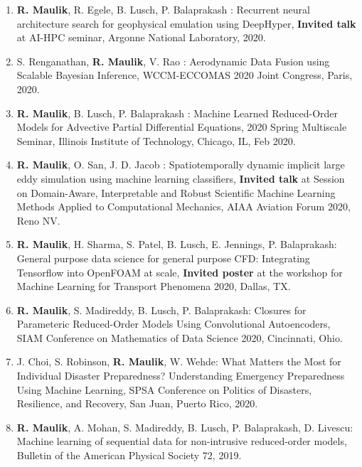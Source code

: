 \documentclass[letterpaper]{article}
\begin{document}
\begin{enumerate}

\item \textbf{R. Maulik}, R. Egele, B. Lusch, P. Balaprakash : Recurrent neural architecture search for geophysical emulation using DeepHyper, \textbf{Invited talk} at AI-HPC seminar, Argonne National Laboratory, 2020.

\item S. Renganathan, \textbf{R. Maulik}, V. Rao : Aerodynamic Data Fusion using Scalable Bayesian Inference, WCCM-ECCOMAS 2020 Joint Congress, Paris, 2020.

\item \textbf{R. Maulik}, B. Lusch, P. Balaprakash : Machine Learned Reduced-Order Models for Advective Partial Differential Equations, 2020 Spring Multiscale Seminar, Illinois Institute of Technology, Chicago, IL, Feb 2020.

\item \textbf{R. Maulik}, O. San, J. D. Jacob : Spatiotemporally dynamic implicit large eddy simulation using machine learning classifiers, \textbf{Invited talk} at Session on Domain-Aware, Interpretable and Robust Scientific Machine Learning Methods Applied to Computational Mechanics, AIAA Aviation Forum 2020, Reno NV. 

\item \textbf{R. Maulik}, H. Sharma, S. Patel, B. Lusch, E. Jennings, P. Balaprakash: General purpose data science for general purpose CFD: Integrating Tensorflow into OpenFOAM at scale, \textbf{Invited poster} at the workshop for Machine Learning for Transport Phenomena 2020, Dallas, TX.

\item \textbf{R. Maulik}, S. Madireddy, B. Lusch, P. Balaprakash: Closures for Parameteric Reduced-Order Models Using Convolutional Autoencoders, SIAM Conference on Mathematics of Data Science 2020, Cincinnati, Ohio.

\item J. Choi, S. Robinson, \textbf{R. Maulik}, W. Wehde: What Matters the Most for Individual Disaster Preparedness? Understanding Emergency Preparedness Using Machine Learning, SPSA Conference on Politics of Disasters, Resilience, and Recovery, San Juan, Puerto Rico, 2020.

\item \textbf{R. Maulik}, A. Mohan, S. Madireddy, B. Lusch, P. Balaprakash, D. Livescu: Machine learning of sequential data for non-intrusive reduced-order models, Bulletin of the American Physical Society 72, 2019.


\end{enumerate}
\end{document}
